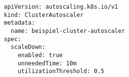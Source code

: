 \begin{verbatim}
apiVersion: autoscaling.k8s.io/v1
kind: ClusterAutoscaler
metadata:
  name: beispiel-cluster-autoscaler
spec:
  scaleDown:
    enabled: true
    unneededTime: 10m
    utilizationThreshold: 0.5
\end{verbatim}